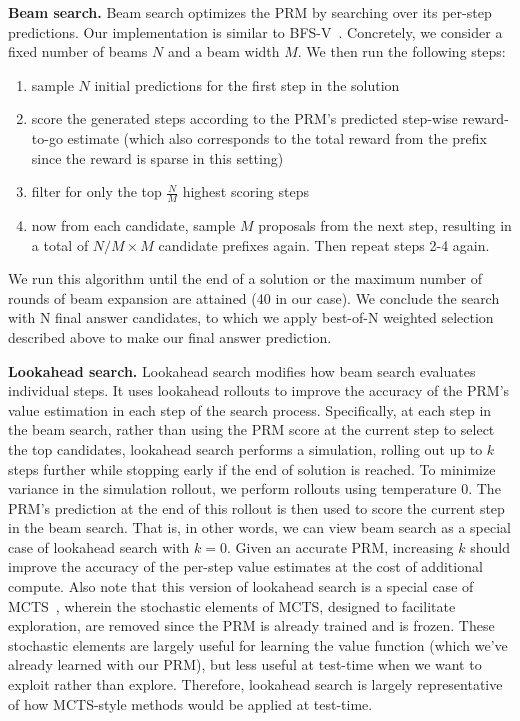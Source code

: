 \textbf{Beam search.} Beam search optimizes the PRM by searching over its per-step predictions. Our implementation is similar to BFS-V~\citep{yao2023tree,feng2024alphazerolike}. Concretely, we consider a fixed number of beams $N$ and a beam width $M$. We then run the following steps:
\begin{enumerate}
\vspace{-0.2cm}
    \item sample $N$ initial predictions for the first step in the solution
    \item score the generated steps according to the PRM's predicted step-wise reward-to-go estimate (which also corresponds to the total reward from the prefix since the reward is sparse in this setting)
    \item filter for only the top $\frac{N}{M}$ highest scoring steps
    \item now from each candidate, sample $M$ proposals from the next step, resulting in a total of $N/M \times M$ candidate prefixes again. Then repeat steps 2-4 again. \vspace{-0.3cm}
\end{enumerate}
We run this algorithm until the end of a solution or the maximum number of rounds of beam expansion are attained (40 in our case). We conclude the search with N final answer candidates, to which we apply best-of-N weighted selection described above to make our final answer prediction.

\textbf{Lookahead search.} Lookahead search modifies how beam search evaluates individual steps.
It uses lookahead rollouts to improve the accuracy of the PRM's value estimation in each step of the search process.
Specifically, at each step in the beam search, rather than using the PRM score at the current step to select the top candidates, lookahead search performs a simulation, rolling out up to $k$ steps further while stopping early if the end of solution is reached. To minimize variance in the simulation rollout, we perform rollouts using temperature 0.
The PRM's prediction at the end of this rollout is then used to score the current step in the beam search.
That is, in other words, we can view beam search as a special case of lookahead search with $k=0$.
Given an accurate PRM, increasing $k$ should improve the accuracy of the per-step value estimates at the cost of additional compute.
Also note that this version of lookahead search is a special case of MCTS~\citep{suttonrlbook}, wherein the stochastic elements of MCTS, designed to facilitate exploration, are removed since the PRM is already trained and is frozen.
These stochastic elements are largely useful for learning the value function (which we've already learned with our PRM), but less useful at test-time when we want to exploit rather than explore.
Therefore, lookahead search is largely representative of how MCTS-style methods would be applied at test-time.

